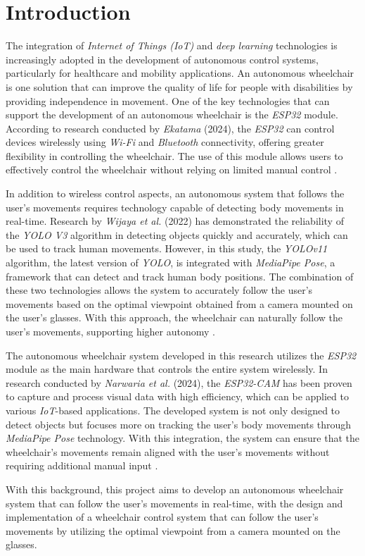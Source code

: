 \section{Introduction}
\label{sec:introduction}


The integration of \emph{Internet of Things (IoT)} and \emph{deep learning} technologies is increasingly adopted in the development of autonomous control systems, particularly for healthcare and mobility applications. An autonomous wheelchair is one solution that can improve the quality of life for people with disabilities by providing independence in movement. One of the key technologies that can support the development of an autonomous wheelchair is the \emph{ESP32} module. According to research conducted by \emph{Ekatama} (2024), the \emph{ESP32} can control devices wirelessly using \emph{Wi-Fi} and \emph{Bluetooth} connectivity, offering greater flexibility in controlling the wheelchair. The use of this module allows users to effectively control the wheelchair without relying on limited manual control \cite{ekatama2024perancangan}.

In addition to wireless control aspects, an autonomous system that follows the user's movements requires technology capable of detecting body movements in real-time. Research by \emph{Wijaya et al.} (2022) has demonstrated the reliability of the \emph{YOLO V3} algorithm in detecting objects quickly and accurately, which can be used to track human movements. However, in this study, the \emph{YOLOv11} algorithm, the latest version of \emph{YOLO}, is integrated with \emph{MediaPipe Pose}, a framework that can detect and track human body positions. The combination of these two technologies allows the system to accurately follow the user's movements based on the optimal viewpoint obtained from a camera mounted on the user's glasses. With this approach, the wheelchair can naturally follow the user's movements, supporting higher autonomy \cite{wijaya2022deteksi}.

The autonomous wheelchair system developed in this research utilizes the \emph{ESP32} module as the main hardware that controls the entire system wirelessly. In research conducted by \emph{Narwaria et al.} (2024), the \emph{ESP32-CAM} has been proven to capture and process visual data with high efficiency, which can be applied to various \emph{IoT}-based applications. The developed system is not only designed to detect objects but focuses more on tracking the user's body movements through \emph{MediaPipe Pose} technology. With this integration, the system can ensure that the wheelchair's movements remain aligned with the user's movements without requiring additional manual input \cite{10696374}.

With this background, this project aims to develop an autonomous wheelchair system that can follow the user's movements in real-time, with the design and implementation of a wheelchair control system that can follow the user's movements by utilizing the optimal viewpoint from a camera mounted on the glasses.

